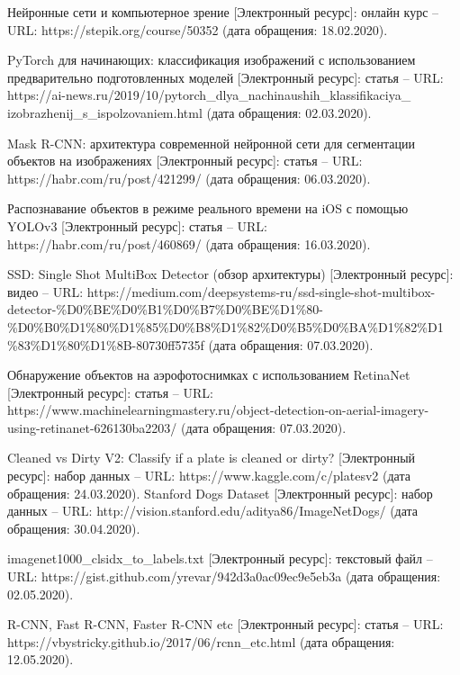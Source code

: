 \newpage

\begin{thebibliography}{9} 
	Нейронные сети и компьютерное зрение [Электронный ресурс]: онлайн курс – URL: 	 https://stepik.org/course/50352 (дата обращения: 18.02.2020).
		
	PyTorch для начинающих: классификация изображений с использованием предварительно подготовленных моделей [Электронный ресурс]: статья – URL: 	 https://ai-news.ru/2019/10/pytorch\_dlya\_nachinaushih\_klassifikaciya\_
	izobrazhenij\_s\_ispolzovaniem.html (дата обращения: 02.03.2020).
	
	Mask R-CNN: архитектура современной нейронной сети для сегментации объектов на изображениях [Электронный ресурс]: статья – URL: https://habr.com/ru/post/421299/ (дата обращения: 06.03.2020).
	
	Распознавание объектов в режиме реального времени на iOS с помощью YOLOv3 [Электронный ресурс]: статья – URL: https://habr.com/ru/post/460869/ (дата обращения: 16.03.2020).
	
	SSD: Single Shot MultiBox Detector (обзор архитектуры) [Электронный ресурс]: видео – URL: https://medium.com/deepsystems-ru/ssd-single-shot-multibox-detector-\%D0\%BE\%D0\%B1\%D0\%B7\%D0\%BE\%D1\%80-\%D0\%B0\%D1\%80\%D1\%85\%D0\%B8\%D1\%82\%D0\%B5\%D0\%BA\%D1\%82\%D1 \%83\%D1\%80\%D1\%8B-80730ff5735f (дата обращения: 07.03.2020).
	
	Обнаружение объектов на аэрофотоснимках с использованием RetinaNet [Электронный ресурс]: статья – URL: https://www.machinelearningmastery.ru/object-detection-on-aerial-imagery-using-retinanet-626130ba2203/ (дата обращения: 07.03.2020).
	
	Cleaned vs Dirty V2: Classify if a plate is cleaned or dirty? [Электронный ресурс]: набор данных – URL: https://www.kaggle.com/c/platesv2 (дата обращения: 24.03.2020).
	Stanford Dogs Dataset [Электронный ресурс]: набор данных – URL: http://vision.stanford.edu/aditya86/ImageNetDogs/ (дата обращения: 30.04.2020).

	imagenet1000\_clsidx\_to\_labels.txt [Электронный ресурс]: текстовый файл – URL: https://gist.github.com/yrevar/942d3a0ac09ec9e5eb3a (дата обращения: 02.05.2020).

	R-CNN, Fast R-CNN, Faster R-CNN etc [Электронный ресурс]: статья – URL: https://vbystricky.github.io/2017/06/rcnn\_etc.html (дата обращения: 12.05.2020).


\end{thebibliography}

